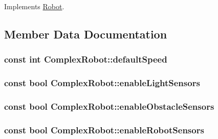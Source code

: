 Implements \hyperlink{classRobot_a3289251979084c50b18a6006547d3f95}{Robot}.



\subsection{Member Data Documentation}
\hypertarget{classComplexRobot_a38ae464727dfb577e24a2b4c1a305e5d}{
\subsubsection[{default\-Speed}]{\setlength{\rightskip}{0pt plus 5cm}const int Complex\-Robot\-::default\-Speed}}\label{classComplexRobot_a38ae464727dfb577e24a2b4c1a305e5d}
\hypertarget{classComplexRobot_a371e0363adebfa9898b7db2827e62216}{
\subsubsection[{enable\-Light\-Sensors}]{\setlength{\rightskip}{0pt plus 5cm}const bool Complex\-Robot\-::enable\-Light\-Sensors}}\label{classComplexRobot_a371e0363adebfa9898b7db2827e62216}
\hypertarget{classComplexRobot_a1a92f81d958c5497dad6c0fb470193e6}{
\subsubsection[{enable\-Obstacle\-Sensors}]{\setlength{\rightskip}{0pt plus 5cm}const bool Complex\-Robot\-::enable\-Obstacle\-Sensors}}\label{classComplexRobot_a1a92f81d958c5497dad6c0fb470193e6}
\hypertarget{classComplexRobot_afbd7060c1ba7505825bd8a6d87755c57}{
\subsubsection[{enable\-Robot\-Sensors}]{\setlength{\rightskip}{0pt plus 5cm}const bool Complex\-Robot\-::enable\-Robot\-Sensors}}\label{classComplexRobot_afbd7060c1ba7505825bd8a6d87755c57}
